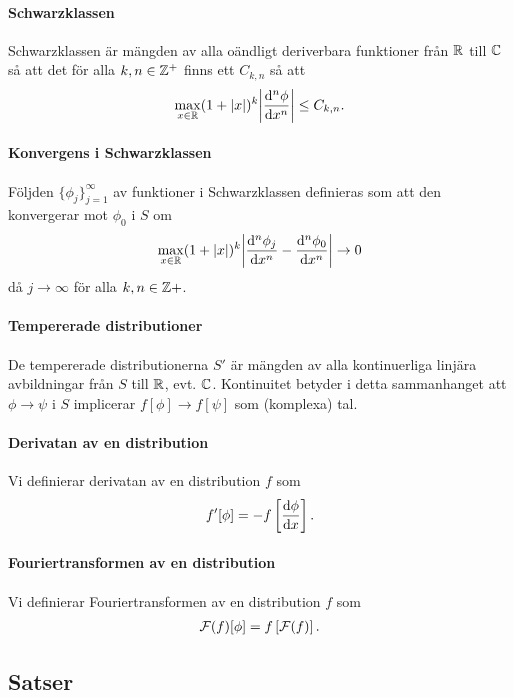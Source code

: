 \paragraph{Schwarzklassen}
Schwarzklassen är mängden av alla oändligt deriverbara funktioner från $\mathbb{R}$ till $\mathbb{C}$ så att det för alla $k, n\in\mathbb{Z}^{+}$ finns ett $C_{k, n}$ så att
\begin{align*}
	\max\limits_{x\in\mathbb{R}}(1 + \abs{x})^{k}\abs{\dv[n]{\phi}{x} (x)} \leq C_{k, n}.
\end{align*}

\paragraph{Konvergens i Schwarzklassen}
Följden $\{\phi_{j}\}_{j = 1}^{\infty}$ av funktioner i Schwarzklassen definieras som att den konvergerar mot $\phi_{0}$ i $S$ om
\begin{align*}
	\max\limits_{x\in\mathbb{R}}(1 + \abs{x})^{k}\abs{\dv[n]{\phi_{j}}{x} (x) - \dv[n]{\phi_{0}}{x} (x)}\to 0
\end{align*}
då $j\to\infty$ för alla $k, n\in\mathbb{Z}{+}$.

\paragraph{Tempererade distributioner}
De tempererade distributionerna $S'$ är mängden av alla kontinuerliga linjära avbildningar från $S$ till $\mathbb{R}$, evt. $\mathbb{C}$. Kontinuitet betyder i detta sammanhanget att $\phi\to\psi$ i $S$ implicerar $f[\phi]\to f[\psi]$ som (komplexa) tal.

\paragraph{Derivatan av en distribution}
Vi definierar derivatan av en distribution $f$ som
\begin{align*}
	f'[\phi] = - f\left[\dv{\phi}{x}\right].
\end{align*}

\paragraph{Fouriertransformen av en distribution}
Vi definierar Fouriertransformen av en distribution $f$ som
\begin{align*}
	\mathcal{F}(f)[\phi] = f\left[\mathcal{F}(f)\right].
\end{align*}

\subsection{Satser}

